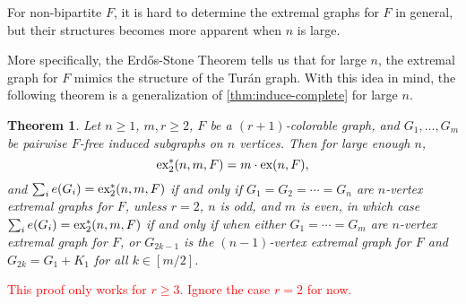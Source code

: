 \documentclass[12pt]{report}
\newtheorem{theorem}{Theorem}[chapter]
\newcommand*{\ex}{\textnormal{ex}}
\newcommand*{\dex}{\textnormal{ex}_2}
\begin{document}
For non-bipartite $F$, it is hard to determine the extremal graphs for $F$ in general, but their structures becomes more apparent when $n$ is large. 

More specifically, the Erdős-Stone Theorem tells us that for large $n$, the extremal graph for $F$ mimics the structure of the Turán graph. With this idea in mind, the following theorem is a generalization of \cref{thm:induce-complete} for large $n$.

\begin{theorem}
  Let $n \geq 1$, $m, r \geq 2$, $F$ be a $(r + 1)$-colorable graph, and $G_1, \ldots, G_m$ be pairwise $F$-free induced subgraphs on $n$ vertices. Then for large enough $n$,
  \[
    \dex^*(n, m, F) = m \cdot \ex(n, F),
  \]
  and $\sum_i e(G_i) = \dex^*(n, m, F)$ if and only if $G_1 = G_2 = \cdots = G_n$ are $n$-vertex extremal graphs for $F$, unless $r = 2$, $n$ is odd, and $m$ is even, in which case $\sum_i e(G_i) = \dex^*(n, m, F)$ if and only if when either $G_1 = \cdots = G_m$ are $n$-vertex extremal graph for $F$, or $G_{2k - 1}$ is the $(n - 1)$-vertex extremal graph for $F$ and $G_{2k} = G_1 + K_1$ for all $k \in [m/2]$.
\end{theorem}

\textcolor{red}{This proof only works for $r \geq 3$. Ignore the case $r = 2$ for now.}
\end{document}
